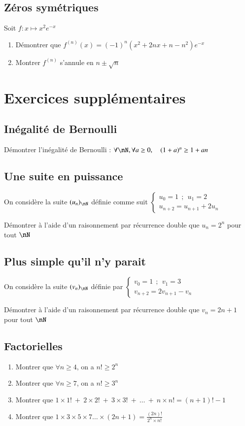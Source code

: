 \documentclass[oneside,12pt]{article}          %
\begin{document}
\subsection{Zéros symétriques}
Soit $f:x\mapsto x^2e^{-x}$
\begin{enumerate}
	\item Démontrer que $f^{(n)}(x)=(-1)^n(x^2+2nx+n-n^2)e^{-x}$
	\item Montrer $f^{(n)}$ s'annule en $n\pm\sqrt{n}$
\end{enumerate}



\section{Exercices supplémentaires}

\subsection{Inégalité de Bernoulli}
Démontrer l'inégalité de Bernoulli : $\forall\nN, \forall a\geq0,\quad (1+a)^n\geq1+an$



\subsection{Une suite en puissance}

On considère la suite $(u_n)_{\nN}$ définie comme suit $\begin{cases}u_0=1~~;~~u_1=2\\u_{n+2}=u_{n+1}+2u_n\end{cases}$

Démontrer à l'aide d'un raisonnement par récurrence double que $u_n=2^n$ pour tout $\nN$


\subsection{Plus simple qu'il n'y parait}

On considère la suite $(v_n)_{\nN}$ définie par $\begin{cases}v_0=1~~;~~v_1=3\\v_{n+2}=2v_{n+1}-v_n\end{cases}$

Démontrer à l'aide d'un raisonnement par récurrence double que $v_n=2n+1$ pour tout $\nN$



\subsection{Factorielles}
\begin{enumerate}
    \item Montrer que $\forall n\geq4$, on a $n!\geq2^n$
    \item Montrer que $\forall n\geq7$, on a $n!\geq3^n$
    \item Montrer que $1\times1!~+~2\times2!~+~3\times3!~+~\ldots~+~n\times n!=(n+1)!-1$
    \item Montrer que $1\times3\times5\times7\ldots\times(2n+1)=\frac{(2n)!}{2^n\times n!}$
\end{enumerate}
\end{document}
